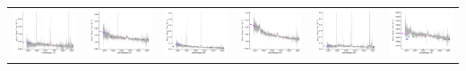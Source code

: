 \begin{center}
\begin{longtable}{l l l l l l }
    \includegraphics[width=0.3\linewidth, clip]{Figs/Figs-sdss/spec-0685-52203-0487-STRIPE82-0002-029499.pdf} & \includegraphics[width=0.3\linewidth, clip]{Figs/Figs-sdss/spec-0687-52518-0113-STRIPE82-0008-003185.pdf} & \includegraphics[width=0.3\linewidth, clip]{Figs/Figs-sdss/spec-0687-52518-0444-STRIPE82-0008-056238.pdf} & \includegraphics[width=0.3\linewidth, clip]{Figs/Figs-sdss/spec-0687-52518-0474-STRIPE82-0008-013742.pdf} & \includegraphics[width=0.3\linewidth, clip]{Figs/Figs-sdss/spec-0688-52203-0315-STRIPE82-0007-044146.pdf} & \includegraphics[width=0.3\linewidth, clip]{Figs/Figs-sdss/spec-0689-52262-0087-STRIPE82-0013-019963.pdf} \\

\end{longtable}
\end{center}

